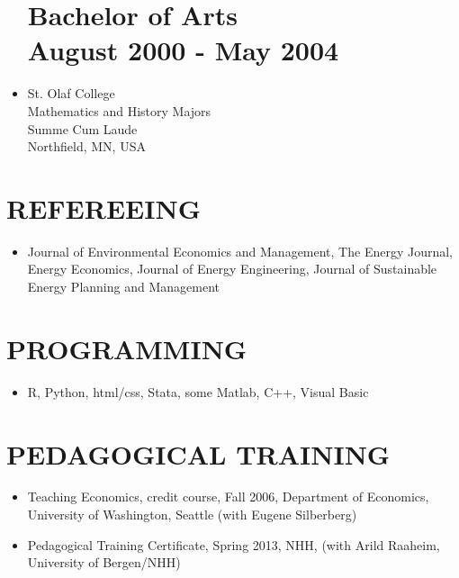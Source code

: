 \documentclass[margin]{res}
\begin{document}
\begin{resume}
\begin{itemize}
\normalsize{\section{\bf Bachelor of Arts \\ August 2000 - May 2004}}
\item[] St. Olaf College  \\
Mathematics and History Majors \\
Summe Cum Laude \\
Northfield, MN, USA \\
\end{itemize}

\section{REFEREEING}  
\begin{itemize}
\item[] Journal of Environmental Economics and Management, The Energy Journal, Energy Economics, Journal of Energy Engineering, Journal of Sustainable Energy Planning and Management
 \end{itemize}

\section{PROGRAMMING}
\begin{itemize}
  \item[] R, Python, html/css, Stata, some Matlab, C++, Visual Basic
\end{itemize}

\section{PEDAGOGICAL TRAINING}
\begin{itemize}
\setlength{\itemsep}{10pt}
\item[] Teaching Economics, credit course, Fall 2006, Department of Economics, University of Washington, Seattle (with Eugene Silberberg)

\item[] Pedagogical Training Certificate, Spring 2013, NHH, (with Arild Raaheim, University of Bergen/NHH)
\end{itemize}



\end{resume} 
\end{document}
